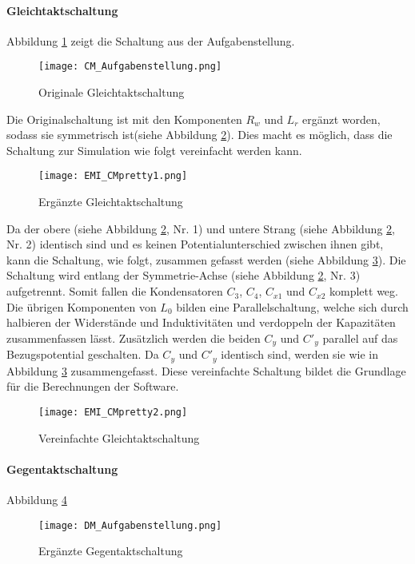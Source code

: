 \paragraph{Gleichtaktschaltung}\label{para:zusammenfassungGleichtakt}
Abbildung \ref{fig:CMSchaltungOriginal} zeigt die Schaltung aus der Aufgabenstellung. 
\begin{figure}[H]
	\centering
	\texttt{[image: CM\_Aufgabenstellung.png]}
	\caption{Originale Gleichtaktschaltung\cite{aufgabenstellung}}
	\label{fig:CMSchaltungOriginal}
\end{figure}
Die Originalschaltung ist mit den Komponenten $R_w$ und $L_r$ ergänzt worden, sodass sie symmetrisch ist(siehe Abbildung \ref{fig:CMSchaltungErgänzt}). Dies macht es möglich, dass die Schaltung zur Simulation wie folgt vereinfacht werden kann.
\begin{figure}[H]
	\centering
	\texttt{[image: EMI\_CMpretty1.png]}
	\caption{Ergänzte Gleichtaktschaltung}
	\label{fig:CMSchaltungErgänzt}
\end{figure}
Da der obere (siehe Abbildung \ref{fig:CMSchaltungErgänzt}, Nr. 1) und untere Strang (siehe Abbildung \ref{fig:CMSchaltungErgänzt}, Nr. 2) identisch sind und es keinen Potentialunterschied zwischen ihnen gibt, kann die Schaltung, wie folgt, zusammen gefasst werden (siehe Abbildung \ref{fig:CMSchaltungvereinfacht}). Die Schaltung wird entlang der Symmetrie-Achse (siehe Abbildung \ref{fig:CMSchaltungErgänzt}, Nr. 3) aufgetrennt. Somit fallen die Kondensatoren $C_3$, $C_4$, $C_{x1}$ und $C_{x2}$ komplett weg. Die übrigen Komponenten von $L_0$ bilden eine Parallelschaltung, welche sich durch halbieren der Widerstände und Induktivitäten und verdoppeln der Kapazitäten zusammenfassen lässt. Zusätzlich werden die beiden $C_y$ und $C'_{y}$ parallel auf das Bezugspotential geschalten. Da $C_y$ und $C'_y$ identisch sind, werden sie wie in Abbildung \ref{fig:CMSchaltungvereinfacht} zusammengefasst. Diese vereinfachte Schaltung bildet die Grundlage für die Berechnungen der Software.
\begin{figure}[H]
	\centering
	\texttt{[image: EMI\_CMpretty2.png]}
	\caption{Vereinfachte Gleichtaktschaltung}
	\label{fig:CMSchaltungvereinfacht}
\end{figure}
\paragraph{Gegentaktschaltung}\label{para:zusammenfassungGegentakt}
Abbildung \ref{fig:DMSchaltungAufgabenstellung}
\begin{figure}[H]
	\centering
	\texttt{[image: DM\_Aufgabenstellung.png]}
	\caption{Ergänzte Gegentaktschaltung}
	\label{fig:DMSchaltungAufgabenstellung}
\end{figure}

